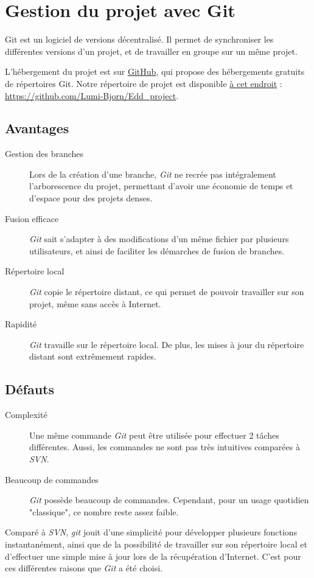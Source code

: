\chapter{Gestion du projet avec Git}

\par\bigskip
Git est un logiciel de versions décentralisé. Il permet de synchroniser les différentes versions d'un projet, et de travailler en groupe sur un même projet.
\par\bigskip
L'hébergement du projet est sur \href{https://github.com}{GitHub}, qui propose des hébergements gratuits de répertoires Git. Notre répertoire de projet est disponible \href{https://github.com/Lumi-Bjorn/Edd_project}{à cet endroit} : \url{https://github.com/Lumi-Bjorn/Edd_project}.
\par\bigskip

\section{Avantages}
\begin{description}
	\item[Gestion des branches]Lors de la création d'une branche, \textit{Git} ne recrée pas intégralement l'arborescence du projet, permettant d'avoir une économie de temps et d'espace pour des projets denses.
	\item[Fusion efficace]\textit{Git} sait s'adapter à des modifications d'un même fichier par plusieurs utilisateurs, et ainsi de faciliter les démarches de fusion de branches.
	\item[Répertoire local]\textit{Git} copie le répertoire distant, ce qui permet de pouvoir travailler sur son projet, même sans accès à Internet.
	\item[Rapidité]\textit{Git} travaille sur le répertoire local. De plus, les mises à jour du répertoire distant sont extrêmement rapides.
\end{description}
\section{Défauts}
\begin{description}
	\item[Complexité]Une même commande \textit{Git} peut être utilisée pour effectuer 2 tâches différentes. Aussi, les commandes ne sont pas très intuitives comparées à \textit{SVN}.
	\item[Beaucoup de commandes] \textit{Git} possède beaucoup de commandes. Cependant, pour un usage quotidien "classique", ce nombre reste assez faible.
\end{description}

\par\bigskip
Comparé à \textit{SVN}, \textit{git} jouit d'une simplicité pour développer plusieurs fonctions instantanément, ainsi que de la possibilité de travailler sur son répertoire local et d'effectuer une simple mise à jour lors de la récupération d'Internet. C'est pour ces différentes raisons que \textit{Git} a été choisi.

